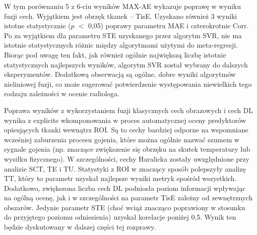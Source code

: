 W tym porównaniu 5 z 6-ciu wyników MAX-AE wykazuje poprawę w wyniku fuzji cech. Wyjątkiem jest obrzęk tkanek -- TisE. Uzyskano również 3 wyniki istotne statystycznie ($p$ $<$ 0,05) poprawy parametru MAE i czterokrotnie Corr. Po za wyjątkiem dla parametru STE uzyskanego przez algorytm SVR, nie ma istotnie statystycznych różnic między algorytmami użytymi do meta-regresji. Biorąc pod uwagę ten fakt, jak również ogólnie największą liczbę istotnie statystycznych najlepszych wyników, algorytm SVR został wybrany do dalszych eksperymentów. Dodatkową obserwacją są ogólne, dobre wyniki algorytmów nieliniowej fuzji, co może sugerować potwierdzenie występowania niewielkich tego rodzaju zależności w ocenie radiologa. 

Poprawa wyników z wykorzystaniem fuzji klasycznych cech obrazowych \linebreak i cech DL wynika z explicite wkomponowania w proces automatycznej oceny predyktorów opisujących tkanki wewnątrz ROI. Są to cechy bardziej odporne na wspomniane wcześniej zaburzenia procesu gojenia, które można ogólnie nazwać szumem w sygnale gojenia (np. znaczące zwiększenie się obrzęku na skutek temperatury lub wysiłku fizycznego). W szczególności, cechy Haralicka zostały uwzględnione przy analizie SCT, TE i TU. Statystyki z ROI w znaczący sposób polepszyły analizę TT, który to parametr uzyskał najlepsze wyniki metryk spośród wszystkich. Dodatkowo, zwiększona liczba cech DL podniosła poziom informacji wpływając na ogólną ocenę, jak i w szczególności na parametr TisE zależny od zewnętrznych obszarów. Jedynie parametr STE (choć wciąż znacząco poprawiony w stosunku do przyjętego poziomu odniesienia) uzyskał korelacje poniżej 0,5. Wynik ten będzie dyskutowany w dalszej części tej rozprawy.

